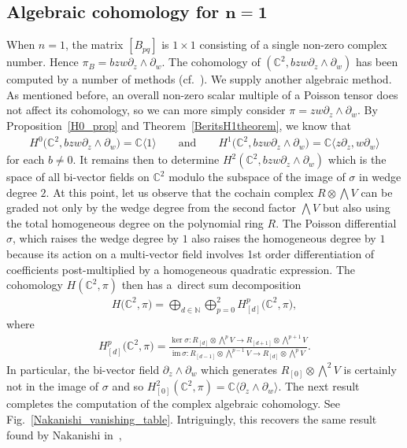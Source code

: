 \documentclass[10pt,a4paper]{amsart}
\numberwithin{equation}{section}
\begin{document}
\subsection[Algebraic cohomology for $n=1$]{Algebraic cohomology for $\boldsymbol{n=1}$} When $n=1$, the matrix $[B_{pq}]$ is $1\times 1$ consisting of a single non-zero complex number. Hence $\pi_B=bzw\partial_z\wedge\partial_w$. The cohomology of $({\mathbb C}^2,bzw\partial_z\wedge\partial_w)$ has been computed by a number of methods (cf.~\cite{Goto,Monnier2}). We supply another algebraic method. As mentioned before, an overall non-zero scalar multiple of a Poisson tensor does not af\/fect its cohomology, so we can more simply consider $\pi=zw\partial_z\wedge\partial_w$. By Proposition~\ref{H0_prop} and Theorem~\ref{BeritsH1theorem}, we know that
\begin{gather*}
H^0\big({\mathbb C}^2,bzw\partial_z\wedge\partial_w\big)={\mathbb C}\langle 1\rangle \qquad \text{and} \qquad H^1\big({\mathbb C}^2,bzw\partial_z\wedge\partial_w\big)={\mathbb C}\langle z\partial_z,w\partial_w\rangle
\end{gather*}
for each $b\not=0$. It remains then to determine $H^2({\mathbb C}^2,bzw\partial_z\wedge\partial_w)$ which is the space of all bi-vector f\/ields on ${\mathbb C}^2$ modulo the subspace of the image of $\sigma$ in wedge degree $2$. At this point, let us observe that the cochain complex $R\otimes \bigwedge V$ can be graded not only by the wedge degree from the second factor $\bigwedge V$ but also using the total homogeneous degree on the polynomial ring $R$. The Poisson dif\/ferential $\sigma$, which raises the wedge degree by $1$ also raises the homogeneous degree by $1$ because its action on a multi-vector f\/ield involves 1st order dif\/ferentiation of coef\/f\/icients post-multiplied by a homogeneous quadratic expression. The cohomology $H({\mathbb C}^2,\pi)$ then has a~direct sum decomposition
\begin{gather*}
H\big({\mathbb C}^2,\pi\big)=\bigoplus_{d\in\mathbb N} \bigoplus_{p=0}^2 H^p_{[d]}\big({\mathbb C}^2,\pi\big),
\end{gather*}
where
\begin{gather*}
H^p_{[d]}\big({\mathbb C}^2,\pi\big)=\frac{\ker \sigma\colon R_{[d]}\otimes \bigwedge^p V\to R_{[d+1]}\otimes \bigwedge^{p+1} V}{\mathrm{im}\,\sigma\colon R_{[d-1]}\otimes \bigwedge^{p-1} V\to R_{[d]}\otimes \bigwedge^p V}.
\end{gather*}
In particular, the bi-vector f\/ield $\partial_z\wedge\partial_w$ which generates $R_{[0]}\otimes \bigwedge^2 V$ is certainly not in the image of $\sigma$ and so $H^2_{[0]}({\mathbb C}^2,\pi)={\mathbb C}\langle \partial_z\wedge\partial_w\rangle$. The next result completes the computation of the complex algebraic cohomology. See Fig.~\ref{Nakanishi_vanishing_table}. Intriguingly, this recovers the same result found by Nakanishi in~\cite{Nakanishi},
\end{document}
